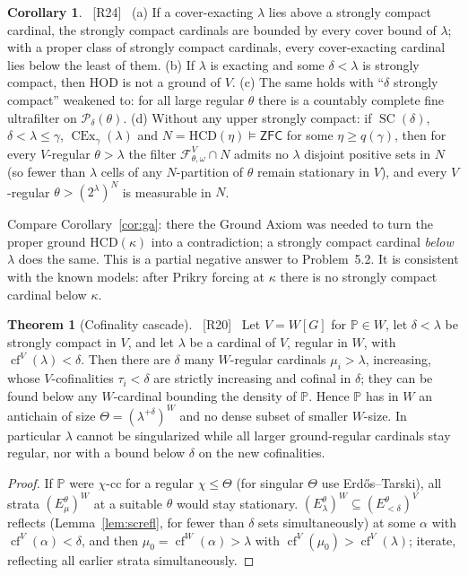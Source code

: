 \documentclass[11pt,letterpaper]{article}
\theoremstyle{definition}
\newtheorem{theorem}[definition]{Theorem}
\newtheorem{corollary}[definition]{Corollary}
\numberwithin{equation}{section}
\newcommand{\ZFC}{\mathsf{ZFC}}
\newcommand{\HOD}{\mathrm{HOD}}
\newcommand{\HCD}{\mathrm{HCD}}
\newcommand{\SC}{\operatorname{SC}}
\newcommand{\CEx}{\operatorname{CEx}}
\newcommand{\cf}{\operatorname{cf}}
\newcommand{\Pow}{\mathcal P}
\newcommand{\PP}{\mathbb P}
\newcommand{\src}[1]{\unskip\ {\normalfont\small\sffamily\color{Olive}[#1]}\ }
\begin{document}
\begin{corollary}\label{cor:sandwichcons}\src{R24}
(a) If a cover-exacting $\lambda$ lies above a strongly compact cardinal, the strongly compact cardinals are bounded by every cover bound of $\lambda$; with a proper class of strongly compact cardinals, every cover-exacting cardinal lies below the least of them. (b) If $\lambda$ is exacting and some $\delta<\lambda$ is strongly compact, then $\HOD$ is not a ground of $V$. (c) The same holds with ``$\delta$ strongly compact'' weakened to: for all large regular $\theta$ there is a countably complete fine ultrafilter on $\Pow_\delta(\theta)$. (d) Without any upper strongly compact: if $\SC(\delta)$, $\delta<\lambda\le\gamma$, $\CEx_\gamma(\lambda)$ and $N=\HCD(\eta)\models\ZFC$ for some $\eta\ge q(\gamma)$, then for every $V$-regular $\theta>\lambda$ the filter $\mathcal F^V_{\theta,\omega}\cap N$ admits no $\lambda$ disjoint positive sets in $N$ (so fewer than $\lambda$ cells of any $N$-partition of $\theta$ remain stationary in $V$), and every $V$-regular $\theta>(2^\lambda)^N$ is measurable in $N$.
\end{corollary}

Compare Corollary~\ref{cor:ga}: there the Ground Axiom was needed to turn the proper ground $\HCD(\kappa)$ into a contradiction; a strongly compact cardinal \emph{below} $\lambda$ does the same. This is a partial negative answer to Problem~5.2. It is consistent with the known models: after Prikry forcing at $\kappa$ there is no strongly compact cardinal below $\kappa$.

\begin{theorem}[Cofinality cascade]\label{thm:cascade}\src{R20}
Let $V=W[G]$ for $\PP\in W$, let $\delta<\lambda$ be strongly compact in $V$, and let $\lambda$ be a cardinal of $V$, regular in $W$, with $\cf^V(\lambda)<\delta$. Then there are $\delta$ many $W$-regular cardinals $\mu_i>\lambda$, increasing, whose $V$-cofinalities $\tau_i<\delta$ are strictly increasing and cofinal in $\delta$; they can be found below any $W$-cardinal bounding the density of $\PP$. Hence $\PP$ has in $W$ an antichain of size $\Theta=(\lambda^{+\delta})^W$ and no dense subset of smaller $W$-size. In particular $\lambda$ cannot be singularized while all larger ground-regular cardinals stay regular, nor with a bound below $\delta$ on the new cofinalities.
\end{theorem}

\begin{proof}
If $\PP$ were $\chi$-cc for a regular $\chi\le\Theta$ (for singular $\Theta$ use Erd\H os--Tarski), all strata $(E^\theta_\mu)^W$ at a suitable $\theta$ would stay stationary. $(E^\theta_\lambda)^W\subseteq(E^\theta_{<\delta})^V$ reflects (Lemma~\ref{lem:screfl}, for fewer than $\delta$ sets simultaneously) at some $\alpha$ with $\cf^V(\alpha)<\delta$, and then $\mu_0=\cf^W(\alpha)>\lambda$ with $\cf^V(\mu_0)>\cf^V(\lambda)$; iterate, reflecting all earlier strata simultaneously.
\end{proof}
\end{document}
